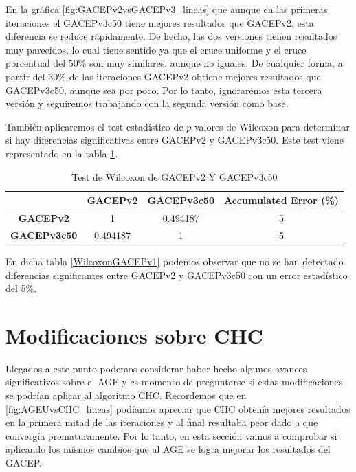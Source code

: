 En la gráfica \ref{fig:GACEPv2vsGACEPv3_lineas} que aunque en las primeras iteraciones el GACEPv3c50 tiene mejores resultados que GACEPv2, esta diferencia se reduce rápidamente. 
De hecho, las dos versiones tienen resultados muy parecidos, lo cual tiene sentido ya que el cruce uniforme y el cruce porcentual del 50\% son muy similares, aunque no iguales. 
De cualquier forma, a partir del 30\% de las iteraciones GACEPv2 obtiene mejores resultados que GACEPv3c50, aunque sea por poco. 
Por lo tanto, ignoraremos esta tercera versión y seguiremos trabajando con la segunda versión como base. 

También aplicaremos el test estadístico de $p$-valores de Wilcoxon para determinar si hay diferencias significativas entre GACEPv2 y GACEPv3c50. 
Este test viene representado en la tabla \ref{WilcoxonGACEPv3}.

\begin{table}[h]
\begin{tabular}{c|c|c|c|}
\cline{2-4}
\multicolumn{1}{l|}{}                     & \textbf{GACEPv2} & \textbf{GACEPv3c50} & \textbf{Accumulated Error   (\%)} \\ \hline
\multicolumn{1}{|c|}{\textbf{GACEPv2}}    & 1                & 0.494187            & 5                                 \\ \hline
\multicolumn{1}{|c|}{\textbf{GACEPv3c50}} & 0.494187         & 1                   & 5                                 \\ \hline
\end{tabular}
\caption{\label{WilcoxonGACEPv3}Test de Wilcoxon de GACEPv2 Y GACEPv3c50}
\end{table}

En dicha tabla \ref{WilcoxonGACEPv1} podemos observar que no se han detectado diferencias significantes entre GACEPv2 y GACEPv3c50 con un error estadístico del 5\%.

\section{Modificaciones sobre CHC}

Llegados a este punto podemos considerar haber hecho algunos avances significativos sobre el AGE y es momento de preguntarse si estas modificaciones se podrían aplicar al algoritmo CHC. 
Recordemos que en \ref{fig:AGEUvsCHC_lineas} podíamos apreciar que CHC obtenía mejores resultados en la primera mitad de las iteraciones y al final resultaba peor dado a que convergía prematuramente. 
Por lo tanto, en esta sección vamos a comprobar si aplicando los mismos cambios que al AGE se logra mejorar los resultados del GACEP. 

